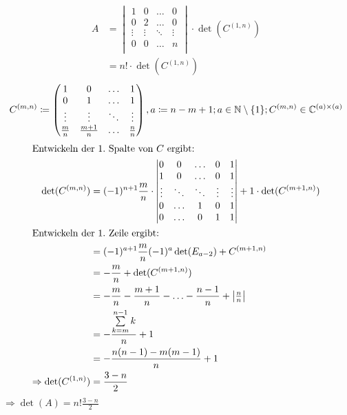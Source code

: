 \documentclass{HM}
\begin{document}
\begin{enumerate}
\begin{enumerate}
			\begin{align*}
				A&=\begin{vmatrix}
					1&0&\hdots&0\\
					0&2&\hdots&0\\
					\vdots&\vdots&\ddots&\vdots\\
					0&0&\hdots&n\\
				\end{vmatrix}\cdot \det(C^{(1,n)})\\
				&=n!\cdot \det(C^{(1,n)})
			\end{align*}	
			$$C^{(m,n)}\coloneqq\begin{pmatrix}
				1&0&\hdots&1\\
				0&1&\hdots&1\\
				\vdots&\vdots&\ddots&\vdots\\
				\tfrac{m}{n}&\tfrac{m+1}{n}&\hdots&\tfrac{n}{n}
			\end{pmatrix}, a\coloneqq n-m+1; a\in\mathbb{N}\setminus\{1\}; C^{(m,n)}\in \mathbb{C}^{(a)\times(a)}$$
			\begin{align*}
				\intertext{Entwickeln der $1.$ Spalte von $C$ ergibt:}
				\det(C^{(m,n)})&=(-1)^{n+1}\frac{m}{n}\cdot\begin{vmatrix}
					0&0&\hdots&0&1\\
					1&0&\hdots&0&1\\
					\vdots&\ddots&\ddots&\vdots&\vdots\\
					0&\hdots&1&0&1\\
					0&\hdots&0&1&1
				\end{vmatrix}+1\cdot \det(C^{(m+1,n)})\\
				\intertext{Entwickeln der $1.$ Zeile ergibt:}
				&=(-1)^{a+1}\frac{m}{n}(-1)^{a}\det(E_{a-2})+C^{(m+1,n)}\\
				&=-\frac{m}{n}+\det(C^{(m+1,n)})\\
				&=-\frac{m}{n}-\frac{m+1}{n}-\hdots-\frac{n-1}{n}+\begin{vmatrix}
					\tfrac{n}{n}
				\end{vmatrix}\\
				&=-\frac{\sum\limits_{k=m}^{n-1}k}{n}+1\\
				&=-\frac{n(n-1)-m(m-1)}{n}+1\\
				\Rightarrow \det(C^{(1,n)}) &= \frac{3-n}{2}
			\end{align*}
			$\Rightarrow \det(A)=n!\frac{3-n}{2}$
			

\end{enumerate}
\end{enumerate}
\end{document}
